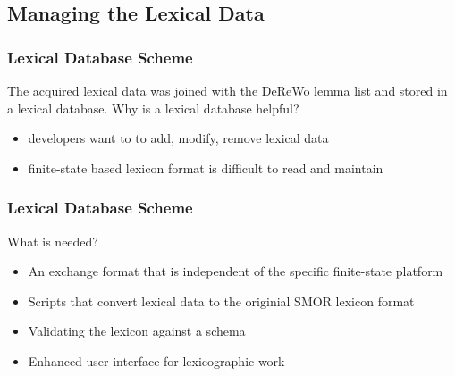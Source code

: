 \documentclass {beamer}
\begin{document}

\subsection{Managing the Lexical Data}
\frame
{
  \frametitle{Lexical Database Scheme }
The acquired lexical data was joined with the DeReWo lemma list and stored in a lexical database.\newline  
Why is a lexical database helpful?
\begin{itemize} 
\item developers want to to add, modify, remove lexical data
\item finite-state based lexicon format is difficult to read and maintain
\end{itemize}
}

\frame
{
  \frametitle{Lexical Database Scheme }
  What is needed?
\begin{itemize}
 \item An exchange format that is independent of the specific finite-state platform
\item Scripts that convert lexical data to the originial SMOR lexicon format
\item Validating the lexicon against a schema
\item Enhanced user interface for lexicographic work 
\end{itemize}
}
\end{document}
